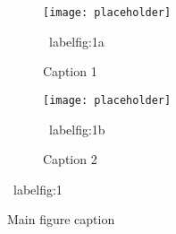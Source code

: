 \begin{figure}
  \centering
  \begin{subfigure}[t]{1in}
    \centering
    \texttt{[image:  placeholder]}
    \caption{Caption  1}
    \ label{fig:1a}
  \end{subfigure}
  \quad
  \begin{subfigure}[t]{1in}
    \centering
    \texttt{[image:  placeholder]}
    \caption{Caption  2}
    \ label{fig:1b}
  \end{subfigure}
  \caption{Main  figure  caption }
  \ label{fig:1}
\end{figure}
